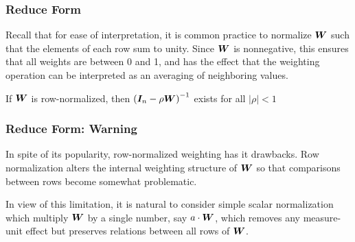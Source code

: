 \documentclass[english,10pt]{beamer}\usepackage[]{graphicx}\usepackage[]{xcolor}
\begin{document}
\begin{frame}
  \frametitle{Reduce Form}
  
  \begin{block}{}
  Recall that for ease of interpretation, it is common practice to normalize $\bm W$ such that the elements of each row sum to unity. Since $\bm W$ is nonnegative, this ensures that all weights are between 0 and 1, and has the effect that the weighting operation can be interpreted as an averaging of neighboring values. 
  \end{block}
  
\begin{theorem}
If $\bm W$ is row-normalized, then  $\left(\bm I_n - \rho\bm W\right)^{-1}$ exists for all $\left|\rho \right| < 1$
\end{theorem}
\end{frame}

\begin{frame}
  \frametitle{Reduce Form: Warning}
    \begin{alertblock}{}
      \alert{In spite of its popularity, row-normalized weighting has it drawbacks.} Row normalization alters the internal weighting structure of $\bm W$ so that comparisons between rows become somewhat problematic.
    \end{alertblock}
    
    \begin{example}{}
    In view of this limitation, it is natural to consider simple scalar normalization which multiply $\bm W$ by a single number, say $a \cdot \bm W$, which removes any measure-unit effect but preserves relations between all rows of $\bm W$. 
    \end{example}
\end{frame}
\end{document}
